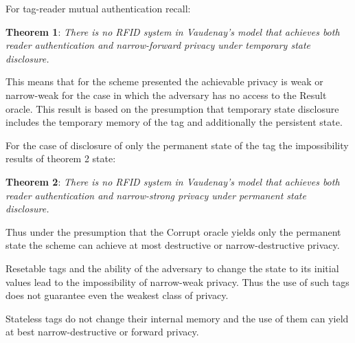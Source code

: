     For tag-reader mutual authentication recall:

    \textbf{Theorem 1}: \textit{There is no RFID system in Vaudenay's model that achieves both reader authentication and narrow-forward privacy 
    under temporary state disclosure.}

    This means that for the scheme presented the achievable privacy is weak or narrow-weak for the case in which the adversary has no
    access to the Result oracle. This result is based on the presumption that temporary state disclosure includes the temporary
    memory of the tag and additionally the persistent state.

    For the case of disclosure of only the permanent state of the tag the impossibility results of theorem 2 state:

    \textbf{Theorem 2}: \textit{There is no RFID system in Vaudenay's model that achieves both reader authentication and narrow-strong privacy 
    under permanent state disclosure.}

    Thus under the presumption that the Corrupt oracle yields only the permanent state the scheme can achieve at most destructive or
    narrow-destructive privacy.

    Resetable tags and the ability of the adversary to change the state to its initial values lead to the impossibility of narrow-weak
    privacy. Thus the use of such tags does not guarantee even the weakest class of privacy.

    Stateless tags do not change their internal memory and the use of them can yield at best narrow-destructive or forward privacy.
